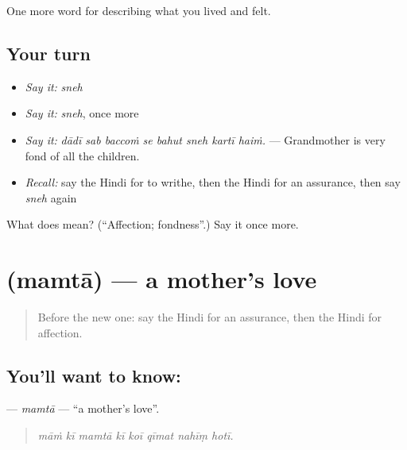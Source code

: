 \begin{grammarlens}[title={What you've built}]
One more word for describing what you lived and felt.
\end{grammarlens}

\subsection*{Your turn}
\begin{itemize}
\raggedright
  \item \emph{Say it:} \emph{sneh}
  \item \emph{Say it:} \emph{sneh}, once more
  \item \emph{Say it:} \emph{dādī sab baccoṁ se bahut sneh kartī haiṁ.} — Grandmother is very fond of all the children.
  \item \emph{Recall:} say the Hindi for to writhe, then the Hindi for an assurance, then say \emph{sneh} again
\end{itemize}

\begin{tcolorbox}[breakable,colback=teal!4,colframe=teal!35!black,title={Before you move on}]
What does  mean? (\textquotedblleft{}Affection; fondness\textquotedblright{}.) Say it once more.
\end{tcolorbox}
\section[\texorpdfstring{\hi{ममता} (mamtā)}{ममता (mamtā)}]{ (mamtā) — a mother's love}

\label{lesson:HI-C459-mamta}



\begin{quote}
Before the new one: say the Hindi for an assurance, then the Hindi for affection.
\end{quote}

\subsection*{You'll want to know: }
\textbf{} — \emph{mamtā} — \textquotedblleft{}a mother's love\textquotedblright{}.

\begin{quote}
       
\end{quote}

\begin{quote}
\emph{māṁ kī mamtā kī koī qīmat nahīṃ hotī.}
\end{quote}

